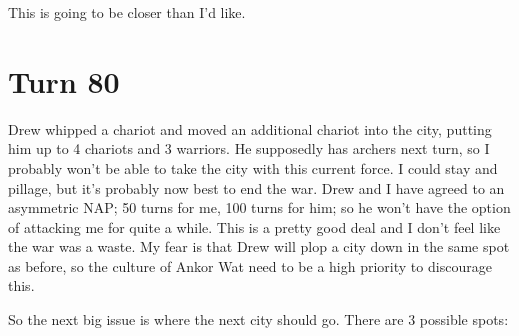 \documentclass[10pt]{article}
\begin{document}
This is going to be closer than I'd like.

\section*{Turn 80}

Drew whipped a chariot and moved an additional chariot into the city,
putting him up to 4 chariots and 3 warriors. He supposedly has archers
next turn, so I probably won't be able to take the city with this
current force. I could stay and pillage, but it's probably now best to
end the war. Drew and I have agreed to an asymmetric NAP; 50 turns for
me, 100 turns for him; so he won't have the option of attacking me for
quite a while. This is a pretty good deal and I don't feel like the
war was a waste. My fear is that Drew will plop a city down in the
same spot as before, so the culture of Ankor Wat need to be a high
priority to discourage this.

So the next big issue is where the next city should go. There are 3 possible spots:
\end{document}
